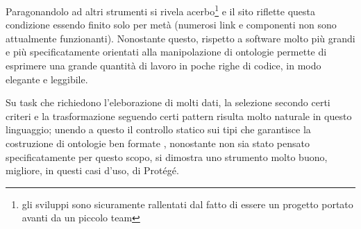 Paragonandolo ad altri strumenti si rivela acerbo\footnote{gli sviluppi sono sicuramente rallentati dal fatto di essere un progetto portato avanti da un piccolo team} e il sito riflette questa condizione essendo finito solo per metà (numerosi link e componenti non sono attualmente funzionanti). Nonostante questo, rispetto a software molto più grandi e più specificatamente orientati alla manipolazione di ontologie \cduce permette di esprimere una grande quantità di lavoro in poche righe di codice, in modo elegante e leggibile. 

Su task che richiedono l'eleborazione di molti dati, la selezione secondo certi criteri e la trasformazione seguendo certi pattern risulta molto naturale in questo linguaggio; unendo a questo il controllo statico sui tipi che garantisce la costruzione di ontologie ben formate \cduce, nonostante non sia stato pensato specificatamente per questo scopo, si dimostra uno strumento molto buono, migliore, in questi casi d'uso, di Protégé.